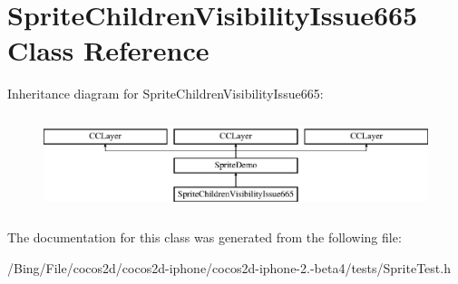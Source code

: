 \hypertarget{interface_sprite_children_visibility_issue665}{\section{Sprite\-Children\-Visibility\-Issue665 Class Reference}
\label{interface_sprite_children_visibility_issue665}
}
Inheritance diagram for Sprite\-Children\-Visibility\-Issue665\-:\begin{figure}[H]
\begin{center}
\leavevmode
\includegraphics[height=2.828283cm]{interface_sprite_children_visibility_issue665}
\end{center}
\end{figure}


The documentation for this class was generated from the following file\-:\begin{DoxyCompactItemize}
\item 
/\-Bing/\-File/cocos2d/cocos2d-\/iphone/cocos2d-\/iphone-\/2.-\/beta4/tests/Sprite\-Test.\-h\end{DoxyCompactItemize}

